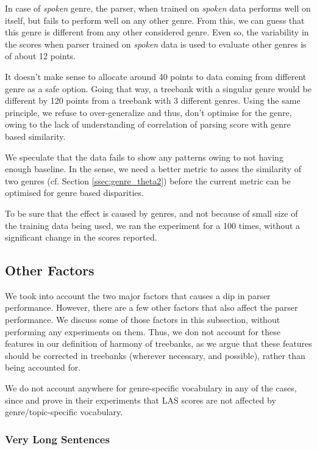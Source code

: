 In case of \textit{spoken} genre, the parser, when trained on \textit{spoken} data performs well on itself, but fails to perform well on any other genre. From this, we can guess that this genre is different from any other considered genre. Even so, the variability in the scores when parser trained on \textit{spoken} data is used to evaluate other genres is of about 12 points.

It doesn't make sense to allocate around 40 points to data coming from different genre as a safe option. Going that way, a treebank with a singular genre would be different by 120 points from a treebank with 3 different genres. Using the same principle, we refuse to over-generalize and thus, don't optimise for the genre, owing to the lack of understanding of correlation of parsing score with genre based similarity.

We speculate that the data fails to show any patterns owing to not having enough baseline. In the sense, we need a better metric to asses the similarity of two genres (cf. Section \ref{ssec:genre_theta2}) before the current metric can be optimised for genre based disparities.

To be sure that the effect is caused by genres, and not because of small size of the training data being used, we ran the experiment for a 100 times, without a significant change in the scores reported.

\subsection{Other Factors}
\label{ssec:others_theta2}

We took into account the two major factors that causes a dip in parser performance. However, there are a few other factors that also affect the parser performance. We discuss some of those factors in this subsection, without performing any experiments on them. Thus, we don not account for these features in our definition of harmony of treebanks, as we argue that these features should be corrected in treebanks (wherever necessary, and possible), rather than being accounted for.

We do not account anywhere for genre-specific vocabulary in any of the cases, since \cite{alonso2016universal} and \cite{RussianTreebanks} prove in their experiments that LAS scores are not affected by genre/topic-specific vocabulary.

\subsubsection{Very Long Sentences}

